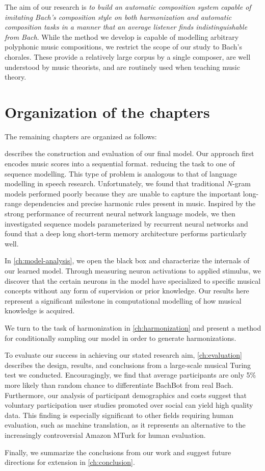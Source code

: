 The aim of our research is \emph{to build an automatic composition system
capable of imitating Bach's composition style on both harmonization and
automatic composition tasks in a manner that an average listener finds
indistinguishable from Bach}. While the method we develop is capable of
modelling arbitrary polyphonic music compositions, we restrict the scope of our
study to Bach's chorales. These provide a relatively large corpus by a single
composer, are well understood by music theorists, and are routinely used when
teaching music theory.

\section{Organization of the chapters}

The remaining chapters are organized as follows:

 describes the construction and evaluation of
our final model. Our approach first encodes music scores into a sequential
format. reducing the task to one of sequence modelling. This type of problem is
analogous to that of language modelling in speech research. Unfortunately, we
found that traditional $N$-gram models performed poorly because they are unable
to capture the important long-range dependencies and precise harmonic rules
present in music. Inspired by the strong performance of recurrent neural
network language models, we then investigated sequence models parameterized by
recurrent neural networks and found that a deep long short-term memory
architecture performs particularly well.

In \vref{ch:model-analysis}, we open the black box and characterize the
internals of our learned model. Through measuring neuron activations to applied
stimulus, we discover that the certain neurons in the model have specialized to
specific musical concepts without any form of supervision or prior knowledge.
Our results here represent a significant milestone in computational modelling
of how musical knowledge is acquired.

We turn to the task of harmonization in \vref{ch:harmonization} and present a
method for conditionally sampling our model in order to generate
harmonizations.

To evaluate our success in achieving our stated research aim,
\vref{ch:evaluation} describes the design, results, and conclusions from a
large-scale musical Turing test we conducted. Encouragingly, we find that
average participants are only 5\% more likely than random chance to
differentiate BachBot from real Bach. Furthermore, our analysis of participant
demographics and costs suggest that voluntary participation user studies
promoted over social can yield high quality data. This finding is especially
significant to other fields requiring human evaluation, such as machine
translation, as it represents an alternative to the increasingly
controversial Amazon MTurk\citep{downs2010your} for human evaluation.

Finally, we summarize the conclusions from our work and suggest future directions
for extension in \vref{ch:conclusion}.
